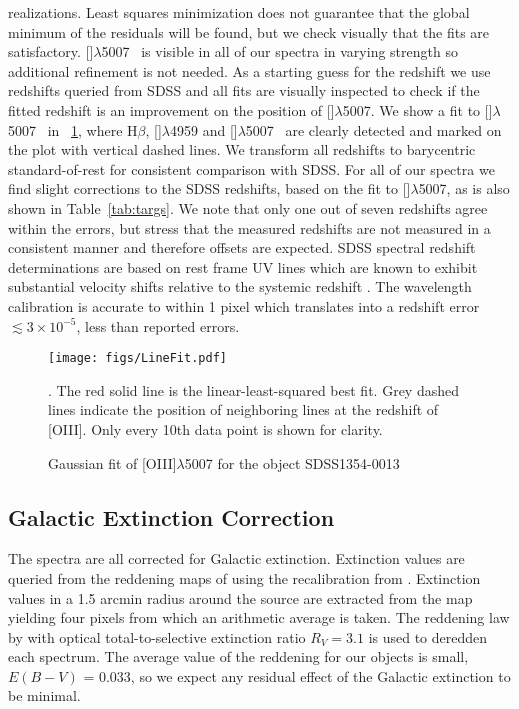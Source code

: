 \documentclass{aa}    %
\newcommand{\figref}[1]{\ref{fig:#1}}
\newcommand{\Fig}[1]{\figurename~\figref{#1}}
\newcommand{\figlabel}[1]{\label{fig:#1}}
\newcommand{\Tab}[1]{Table~\ref{tab:#1}}
\newcommand{\tab}[1]{\Tab{#1}}
\newcommand{\sectlabel}[1]{\label{sect:#1}}
\newcommand{\hb}{H$\beta$}
\newcommand{\oiii}{[\ion{O}{iii}]$\lambda$5007}
\begin{document}
realizations. Least squares minimization does not guarantee that the global minimum of the
 residuals will be found, but we check
visually that the fits are satisfactory. \oiii~ is visible in all of
our spectra in varying strength so additional refinement is not
needed. As a starting guess for the redshift we use redshifts queried
from SDSS and all fits are visually inspected to check if the fitted
redshift is an improvement on the position of \oiii. We show a fit to
\oiii~ in \Fig{linefit}, where \hb, []$\lambda$4959 and
\oiii~ are clearly detected and marked on the plot with vertical
dashed lines. We transform all redshifts to barycentric standard-of-rest for consistent
comparison with SDSS. For all of our spectra we find slight
corrections to the SDSS redshifts, based on the fit to \oiii, as is
also shown in \tab{targs}. We note that only one out of seven
redshifts agree within the errors, but stress that the measured
redshifts are not measured in a consistent manner and therefore
offsets are expected. SDSS spectral redshift determinations are based
on rest frame UV lines which are known to exhibit substantial velocity
shifts relative to the systemic redshift \citep{Tytler1992,
  Hewett2010}. The wavelength calibration is accurate to within 1
pixel \citep{Kruhler2015} which translates into a redshift error
$\lesssim 3\times 10^{-5}$, less than reported errors.

\begin{figure}[t!]
  \centering
  \texttt{[image: figs/LineFit.pdf]}
  \caption[]{Gaussian fit of [OIII]$\lambda$5007 for the object SDSS1354-0013}. The red solid line is the
linear-least-squared best fit. Grey dashed lines indicate the
position of neighboring lines at the redshift of [OIII]. Only every 10th data point is shown for clarity.
  \figlabel{linefit}
\end{figure}




\subsection{Galactic Extinction Correction} \sectlabel{extinct}

The spectra are all corrected for Galactic extinction. Extinction
values are queried from the reddening maps of \citet{Schlegel1998}
using the recalibration from \citet{Schlafly2011}. Extinction values
in a 1.5 arcmin radius around the source are extracted from the map yielding four pixels from which an arithmetic average is taken. The reddening law by
\citet{Fitzpatrick1999} with optical total-to-selective extinction
ratio $R_V = 3.1$ is used to deredden each spectrum. The average value
of the reddening for our objects is small, $E(B-V)$ = 0.033, so we
expect any residual effect of the Galactic extinction to be minimal.
\end{document}
